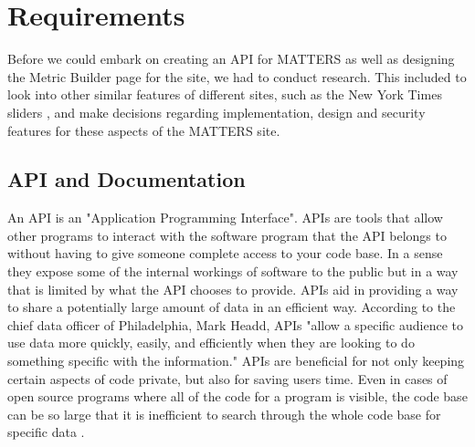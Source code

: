 	\section{Requirements}

		Before we could embark on creating an API for MATTERS as well as 
		designing the Metric Builder page for the site, we had to conduct 
		research. This included to look into other similar features of different 
		sites, such as the New York Times sliders \cite{slider}, and make decisions 
		regarding implementation, design and security features for these aspects 
		of the MATTERS site.

	\subsection{API and Documentation}

		An API is an "Application Programming Interface". APIs are tools that 
		allow other programs to interact with the software program that the API 
		belongs to without having to give someone complete access to your code 
		base. In a sense they expose some of the internal workings of software 
		to the public but in a way that is limited by what the API chooses to 
		provide. APIs aid in providing a way to share a potentially large 
		amount of data in an efficient way. According to the chief data officer 
		of Philadelphia, Mark Headd, APIs "allow a specific audience to use data
		more quickly, easily, and efficiently when they are looking to do 
		something specific with the information." APIs are beneficial for not 
		only keeping certain aspects of code private, but also for saving users 
		time. Even in cases of open source programs where all of the code for a 
		program is visible, the code base can be so large that it is inefficient 
		to search through the whole code base for specific data \cite{govapi}. 

